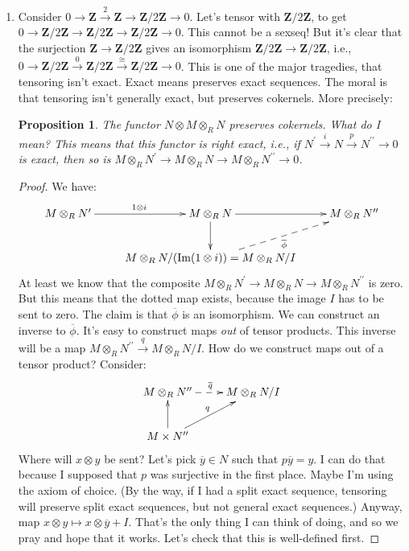 \documentclass{amsart}
\theoremstyle{theorem}
\newtheorem{prop}[theorem]{Proposition}
\theoremstyle{definition}
\newtheorem{example}[theorem]{Example}
\DeclareMathOperator{\img}{Im}
\newcommand{\Z}{\mathbf Z}
\begin{document}
\begin{enumerate}
\begin{equation*}
{M & R\otimes M\ar[l]^{\varphi}}
\end{equation*}
\begin{example}
What if we let $A=\Z/n\Z$? Then if $B$ is an abelian group (i.e., a $\Z$-module), $B\otimes \Z/n\Z\cong B/nB$.
\end{example}
\item Consider $0\to \Z\xrightarrow{2}\Z\to \Z/2\Z\to 0$. Let's tensor with $\Z/2\Z$, to get $0\to \Z/2\Z\to\Z/2\Z\to\Z/2\Z\to 0$. This cannot be a sexseq! But it's clear that the surjection $\Z\to\Z/2\Z$ gives an isomorphism $\Z/2\Z\to\Z/2\Z$, i.e., $0\to \Z/2\Z\xrightarrow{0}\Z/2\Z\xrightarrow{\cong}\Z/2\Z\to 0$. This is one of the major tragedies, that tensoring isn't exact. Exact means preserves exact sequences. The moral is that tensoring isn't generally exact, but preserves cokernels. More precisely:
\begin{prop}
The functor $N\otimes M\otimes_R N$ preserves cokernels. What do I mean? This means that this functor is \emph{right exact}, i.e., if $N^\prime\xrightarrow{i} N\xrightarrow{p} N^{\prime\prime}\to 0$ is exact, then so is $M\otimes_R N^\prime\to M\otimes_R N\to M\otimes_R N^{\prime\prime}\to 0$.
\end{prop}
\begin{proof}
We have:
\begin{equation*}
\xymatrix{M\otimes_R N^\prime\ar[r]^{1\otimes i} & M\otimes_R N\ar[r]\ar[d] & M\otimes_R N^{\prime\prime}\\
 & M\otimes_R N/(\img(1\otimes i))=M\otimes_R N/I\ar@{-->}[ur]_{\overline{\phi}}}
\end{equation*}
At least we know that the composite $M\otimes_R N^\prime\to M\otimes_R N\to M\otimes_R N^{\prime\prime}$ is zero. But this means that the dotted map exists, because the image $I$ has to be sent to zero. The claim is that $\overline{\phi}$ is an isomorphism. We can construct an inverse to $\overline{\phi}$. It's easy to construct maps \emph{out} of tensor products. This inverse will be a map $M\otimes_R N^{\prime\prime}\xrightarrow{q}M\otimes_R N/I$. How do we construct maps out of a tensor product? Consider:
\begin{equation*}
\xymatrix{M\otimes_R N^{\prime\prime}\ar@{-->}[r]^{\overline{q}} & M\otimes_R N/I\\
M\times N^{\prime\prime}\ar[u]\ar[ur]^q}
\end{equation*}
Where will $x\otimes y$ be sent? Let's pick $\overline{y}\in N$ such that $p\overline{y}=y$. I can do that because I supposed that $p$ was surjective in the first place. Maybe I'm using the axiom of choice. (By the way, if I had a split exact sequence, tensoring will preserve split exact sequences, but not general exact sequences.) Anyway, map $x\otimes y\mapsto x\otimes\overline{y}+I$. That's the only thing I can think of doing, and so we pray and hope that it works. Let's check that this is well-defined first.


\end{proof}
\end{enumerate}
\end{document}
